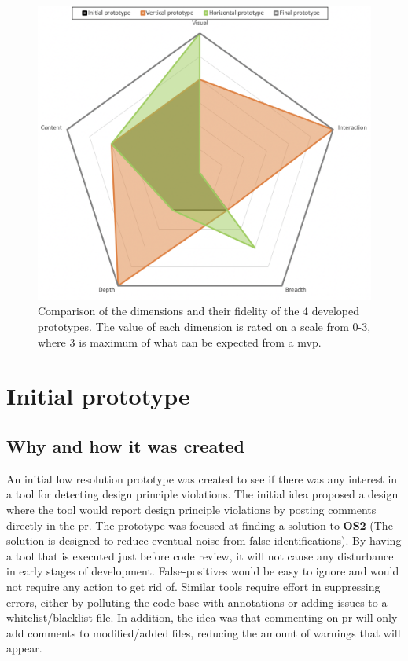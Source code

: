 \documentclass{report}
\begin{document}
\begin{figure}[h!]
    \centering
    \includegraphics[width=\linewidth]{../images/radar-chart.png}
    \caption{Comparison of the dimensions and their fidelity of the 4 developed prototypes. The value of each dimension is rated on a scale from 0-3, where 3 is maximum of what can be expected from a \gls{mvp}.}
    \label{fig:radar-chart}
\end{figure}


\section{Initial prototype}
\subsection*{Why and how it was created}
An initial low resolution prototype was created to see if there was any interest in a tool for detecting design principle violations. The initial idea proposed a design where the tool would report design principle violations by posting comments directly in the \gls{pr}. The prototype was focused at finding a solution to \textbf{OS2} (The solution is designed to reduce eventual noise from false identifications). By having a tool that is executed just before code review, it will not cause any disturbance in early stages of development. False-positives would be easy to ignore and would not require any action to get rid of. Similar tools require effort in suppressing errors, either by polluting the code base with annotations or adding issues to a whitelist/blacklist file. In addition, the idea was that commenting on \gls{pr} will only add comments to modified/added files, reducing the amount of warnings that will appear.  
\end{document}
